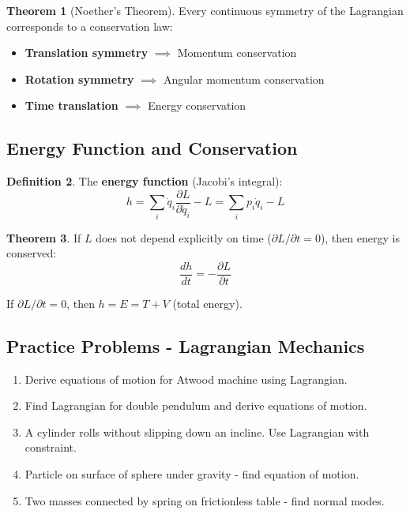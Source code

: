 \documentclass[12pt,a4paper]{article}
\theoremstyle{definition}
\newtheorem{theorem}{Theorem}[section]
\newtheorem{definition}[theorem]{Definition}
\begin{document}
\begin{theorem}[Noether's Theorem]
Every continuous symmetry of the Lagrangian corresponds to a conservation law:
\begin{itemize}
    \item \textbf{Translation symmetry} $\implies$ Momentum conservation
    \item \textbf{Rotation symmetry} $\implies$ Angular momentum conservation
    \item \textbf{Time translation} $\implies$ Energy conservation
\end{itemize}
\end{theorem}

\subsection{Energy Function and Conservation}

\begin{definition}
The \textbf{energy function} (Jacobi's integral):
\[
h = \sum_i \dot{q}_i \frac{\partial L}{\partial \dot{q}_i} - L = \sum_i p_i\dot{q}_i - L
\]
\end{definition}

\begin{theorem}
If $L$ does not depend explicitly on time ($\partial L/\partial t = 0$), then energy is conserved:
\[
\frac{dh}{dt} = -\frac{\partial L}{\partial t}
\]

If $\partial L/\partial t = 0$, then $h = E = T + V$ (total energy).
\end{theorem}

\subsection{Practice Problems - Lagrangian Mechanics}

\begin{enumerate}
    \item Derive equations of motion for Atwood machine using Lagrangian.
    
    \item Find Lagrangian for double pendulum and derive equations of motion.
    
    \item A cylinder rolls without slipping down an incline. Use Lagrangian with constraint.
    
    \item Particle on surface of sphere under gravity - find equation of motion.
    
    \item Two masses connected by spring on frictionless table - find normal modes.
\end{enumerate}
\end{document}
